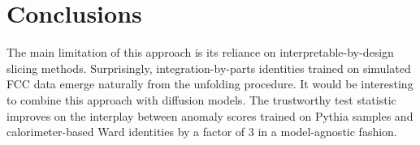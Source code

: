 \section{Conclusions}\label{sec:conclusions}

The main limitation of this approach is its reliance on
interpretable-by-design slicing methods. Surprisingly,
integration-by-parts identities trained on simulated FCC data emerge
naturally from the unfolding procedure. It would be interesting to
combine this approach with diffusion models. The trustworthy test
statistic improves on the interplay between anomaly scores trained on
Pythia samples and calorimeter-based Ward identities by a factor of 3 in
a model-agnostic fashion.

